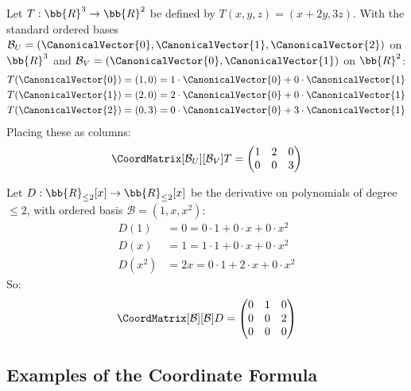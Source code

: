 \begin{example}
\label{ex:matrix-of-map}
    Let $T: \bb{R}^3 \to \bb{R}^2$ be defined by $T(x,y,z) = (x + 2y, 3z)$. With the
    standard ordered bases $\mathcal{B}_U = (\CanonicalVector{0}, \CanonicalVector{1}, \CanonicalVector{2})$ on $\bb{R}^3$ and
    $\mathcal{B}_V = (\CanonicalVector{0}, \CanonicalVector{1})$ on $\bb{R}^2$:
    \begin{align*}
        T(\CanonicalVector{0}) &= (1, 0) = 1 \cdot \CanonicalVector{0} + 0 \cdot \CanonicalVector{1} \\
        T(\CanonicalVector{1}) &= (2, 0) = 2 \cdot \CanonicalVector{0} + 0 \cdot \CanonicalVector{1} \\
        T(\CanonicalVector{2}) &= (0, 3) = 0 \cdot \CanonicalVector{0} + 3 \cdot \CanonicalVector{1}
    \end{align*}
    Placing these as columns:
    \[
        \CoordMatrix[\mathcal{B}_U][\mathcal{B}_V]{T}
        = \begin{pmatrix} 1 & 2 & 0 \\ 0 & 0 & 3 \end{pmatrix}
    \]
\end{example}

\begin{example}
\label{ex:matrix-of-map-nonstandard}
    Let $D: \bb{R}_{\leq 2}[x] \to \bb{R}_{\leq 2}[x]$ be the derivative on polynomials of
    degree $\leq 2$, with ordered basis $\mathcal{B} = (1, x, x^2)$:
    \begin{align*}
        D(1) &= 0 = 0 \cdot 1 + 0 \cdot x + 0 \cdot x^2 \\
        D(x) &= 1 = 1 \cdot 1 + 0 \cdot x + 0 \cdot x^2 \\
        D(x^2) &= 2x = 0 \cdot 1 + 2 \cdot x + 0 \cdot x^2
    \end{align*}
    So:
    \[
        \CoordMatrix[\mathcal{B}][\mathcal{B}]{D}
        = \begin{pmatrix} 0 & 1 & 0 \\ 0 & 0 & 2 \\ 0 & 0 & 0 \end{pmatrix}
    \]
\end{example}

\subsection{Examples of the Coordinate Formula}

